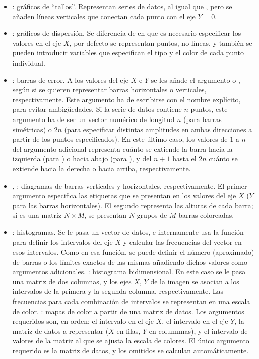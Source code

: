 ﻿\documentclass[spanish]{article}
\begin{document}
\begin{itemize}
\item {}: gráficos de ``tallos''. Representan series de datos,
al igual que , pero se añaden líneas verticales que conectan
cada punto con el eje $Y=0$.
\item {}: gráficos de dispersión. Se diferencia de 
en que es necesario especificar los valores en el eje $X$, por defecto se
representan puntos, no líneas, y también se pueden introducir variables que
especifican el tipo y el color de cada punto individual.
\item {}: barras de error. A los valores del eje $X$ e $Y$ se
les añade el argumento  o , según si se quieren
representar barras horizontales o verticales, respectivamente. Este argumento
ha de escribirse con el nombre explícito, para evitar ambigüedades. Si la serie
de datos contiene $n$ puntos, este argumento ha de ser un vector numérico de
longitud $n$ (para barras simétricas) o $2n$ (para especificar distintas
amplitudes en ambas direcciones a partir de los puntos especificados). En
este último caso, los valores de $1$ a $n$ del argumento adicional representa
cuánto se extiende la barra hacia la izquierda (para )
o hacia abajo (para ), y del $n+1$ hasta el $2n$ cuánto se extiende
hacia la derecha o hacia arriba, respectivamente.
\item {}, : diagramas de barras verticales y horizontales,
respectivamente. El primer argumento especifica las etiquetas que se presentan
en los valores del eje $X$ ($Y$ para las barras horizontales). El segundo
representa las alturas de cada barra; si es una matriz $N\times{}M$, se presentan
$N$ grupos de $M$ barras coloreadas.
\item {}: histogramas. Se le pasa un vector de datos, e internamente
usa la función  para definir los intervalos del eje $X$ y calcular las frecuencias
del vector en esos intervalos. Como en esa función,
se puede definir el número (aproximado) de barras o los límites exactos de las
mismas añadiendo dichos valores como argumentos adicionales.
: histograma bidimensional. En este caso se le pasa una matriz
de dos columnas, y los ejes $X$, $Y$ de la imagen se asocian a los intervalos
de la primera y la segunda columna, respectivamente. Las frecuencias para cada
combinación de intervalos se representan en una escala de color.
: mapas de color a partir de una matriz de datos.
Los argumentos requeridos son, en orden:
el intervalo en el eje $X$, el intervalo en el eje $Y$, la matriz de datos
a representar ($X$ en filas, $Y$ en columnnas), y el intervalo de valores de
la matriz al que se ajusta la escala de colores. El único argumento requerido
es la matriz de datos, y los omitidos se calculan automáticamente.
\end{itemize}
\end{document}
